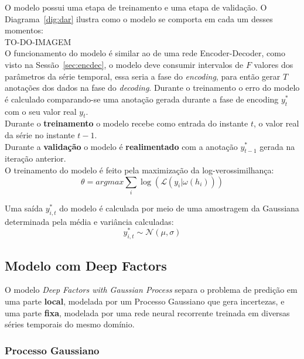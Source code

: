 O modelo possui uma etapa de treinamento e uma etapa de validação. O Diagrama~\ref{dig:dar} ilustra como o modelo se comporta em cada um desses momentos: \\


TO-DO-IMAGEM \\


O funcionamento do modelo é similar ao de uma rede Encoder-Decoder, como visto na Sessão~\ref{sec:encdec}, o modelo deve consumir intervalos de $F$ valores dos parâmetros da série temporal, essa seria a fase do \textit{encoding}, para então gerar $T$ anotações dos dados na fase do \textit{decoding}. Durante o treinamento o erro do modelo é calculado comparando-se uma anotação gerada durante a fase de encoding $y^{*}_{t}$ com o seu valor real $y_{t}$. \\

Durante o \textbf{treinamento} o modelo recebe como entrada do instante $t$, o valor real da série no instante $t-1$. \\

Durante a \textbf{validação} o modelo é \textbf{realimentado} com a anotação $y^{*}_{t-1}$ gerada na iteração anterior. \\ 



O treinamento do modelo é feito pela maximização da log-verossimilhança: \\

\[
\theta = argmax \sum_i{\log(\mathcal{L}(y_i | \omega(h_{i})))}
\]


Uma saída $y^*_{i,t}$ do modelo é calculada por meio de uma amostragem da Gaussiana determinada pela média e variância calculadas: \\

\[
 y^*_{i,t} \sim \mathcal{N}(\mu,\sigma) 
\]

\subsection{Modelo com Deep Factors}

O modelo \textit{Deep Factors with Gaussian Process} \cite{deepfactors} separa o problema de predição em uma parte \textbf{local}, modelada por um Processo Gaussiano que gera incertezas, e uma parte \textbf{fixa}, modelada por uma rede neural recorrente treinada em diversas séries temporais do mesmo domínio.

\subsubsection{Processo Gaussiano}

